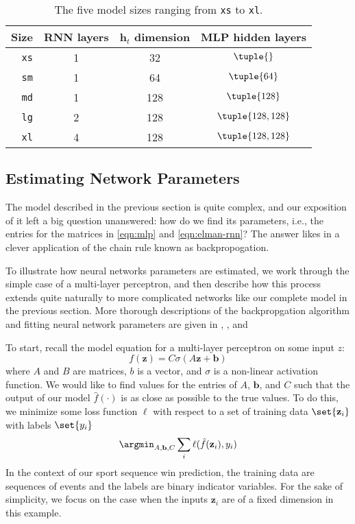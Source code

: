 \begin{table}
	\begin{tabular}{r ccc}
		\hline
		Size        & RNN layers & $\mathbf h_t$ dimension & MLP hidden layers  \\
		\hline
		\texttt{xs} & 1          & 32                      & $\tuple{}$         \\
		\texttt{sm} & 1          & 64                      & $\tuple{64}$       \\
		\texttt{md} & 1          & 128                     & $\tuple{128}$      \\
		\texttt{lg} & 2          & 128                     & $\tuple{128, 128}$ \\
		\texttt{xl} & 4          & 128                     & $\tuple{128, 128}$ \\
		\hline
	\end{tabular}
	\caption{The five model sizes ranging from \texttt{xs} to \texttt{xl}.}
	\label{tbl:model-sizes}
\end{table}

\subsection{Estimating Network Parameters}


The model described in the previous section is quite complex, and our exposition of it left a big question unanswered: how do we find its parameters, i.e., the entries for the matrices in \autoref{eqn:mlp} and \autoref{eqn:elman-rnn}? The answer likes in a clever application of the chain rule known as backpropogation.

To illustrate how neural networks parameters are estimated, we work through the simple case of a multi-layer perceptron, and then describe how this process extends quite naturally to more complicated networks like our complete model in the previous section. More thorough descriptions of the backpropgation algorithm and fitting neural network parameters are given in \textcite[\S 13.4]{PML}, \textcite[\S 11.4]{ESL}, and \textcite[10.7]{ISL}

To start, recall the model equation for a multi-layer perceptron on some input $z$:
\begin{equation}
	f(\mathbf z) = C \sigma (A\mathbf z + \mathbf b)
\end{equation}
where $A$ and $B$ are matrices, $b$ is a vector, and $\sigma$ is a non-linear activation function. We would like to find values for the entries of $A$, $\mathbf b$, and $C$ such that the output of our model $\hat f(\cdot)$ is as close as possible to the true values. To do this, we minimize some loss function $\ell$ with respect to a set of training data $\set{\mathbf z_i}$ with labels $\set{y_i}$
\begin{equation*}
	\argmin_{A, \mathbf b, C} \sum_i \ell(\hat f(\mathbf z_i), y_i)
\end{equation*}
In the context of our sport sequence win prediction, the training data are sequences of events and the labels are binary indicator variables. For the sake of simplicity, we focus on the case when the inputs $\mathbf z_i$ are of a fixed dimension in this example.


